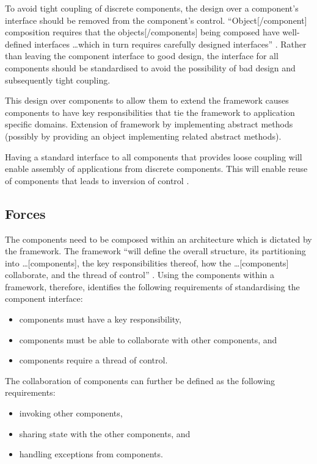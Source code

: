 \documentclass[prodmode]{style/acmlarge}
\begin{document}
To avoid tight coupling of discrete components, the design over a component's
interface should be removed from the component's control. ``Object[/component]
composition requires that the objects[/components] being composed have
well-defined interfaces \ldots which in turn requires carefully designed
interfaces'' \cite[p. 19]{gof}.  Rather than leaving the component interface to
good design, the interface for all components should be standardised to avoid
the possibility of bad design and subsequently tight coupling.

This design over components to allow them to extend the framework causes
components to have key responsibilities that tie the framework to application
specific domains.  Extension of framework by implementing abstract methods
(possibly by providing an object implementing related abstract methods).

Having a standard interface to all components that provides loose coupling will
enable assembly of applications from discrete components.  This will enable
reuse of components that leads to inversion of control \cite[p. 27]{gof}.


\subsection{Forces}

The components need to be composed within an architecture which is dictated by
the framework.  The framework ``will define the overall structure, its
partitioning into \ldots [components], the key responsibilities thereof, how the
\ldots [components] collaborate, and the thread of control'' \cite[p.26]{gof}. 
Using the components within a framework, therefore, identifies the following
requirements of standardising the component interface:
\begin{itemize}
  \item components must have a key responsibility,
  \item components must be able to collaborate with other components, and
  \item components require a thread of control.
\end{itemize}

The collaboration of components can further be defined as the following
requirements:
\begin{itemize}
  \item invoking other components,
  \item sharing state with the other components, and
  \item handling exceptions from components.
\end{itemize}
\end{document}
